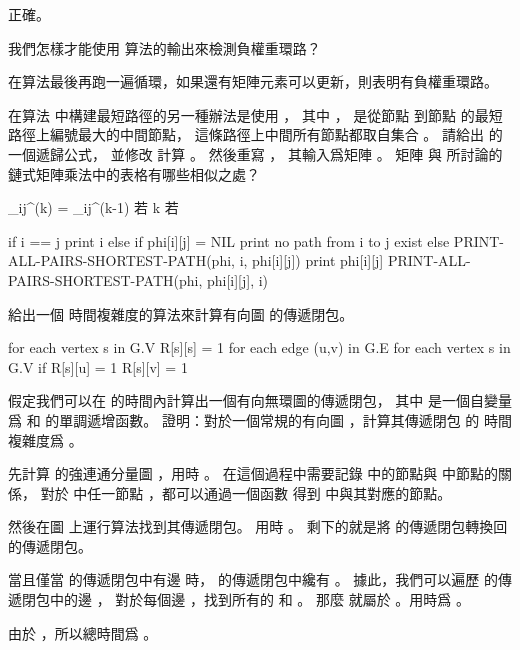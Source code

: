 \startANSWER
正確。
\stopANSWER

\startEXERCISE
我們怎樣才能使用  算法的輸出來檢測負權重環路？
\stopEXERCISE

\startANSWER
在算法最後再跑一遍循環，如果還有矩陣元素可以更新，則表明有負權重環路。
\stopANSWER

\startEXERCISE
在算法  中構建最短路徑的另一種辦法是使用 ，
其中 ，
  是從節點  到節點  的最短路徑上編號最大的中間節點，
這條路徑上中間所有節點都取自集合 。
請給出  的一個遞歸公式，
並修改  計算 。
然後重寫 ，
其輸入爲矩陣 。
矩陣 \m{\Phi} 與 所討論的鏈式矩陣乘法中的表格有哪些相似之處？
\stopEXERCISE

\startANSWER
\startformula
\phi_{ij}^{(k)} = \startcases
\NC \phi_{ij}^{(k-1)} \NC 若  \NR
\NC k \NC 若  \NR
\stopcases
\stopformula

\startCLRS
if i == j
	print i
else if phi[i][j] = NIL
	print no path from i to j exist
else
	PRINT-ALL-PAIRS-SHORTEST-PATH(phi, i, phi[i][j])
	print phi[i][j]
	PRINT-ALL-PAIRS-SHORTEST-PATH(phi, phi[i][j], i)
\stopCLRS
\stopANSWER

\startEXERCISE
給出一個  時間複雜度的算法來計算有向圖  的傳遞閉包。
\stopEXERCISE

\startANSWER
\startCLRS
for each vertex s in G.V
	R[s][s] = 1
for each edge (u,v) in G.E
	for each vertex s in G.V
		if R[s][u] = 1
			R[s][v] = 1
\stopCLRS
\stopANSWER

\startEXERCISE
假定我們可以在  的時間內計算出一個有向無環圖的傳遞閉包，
其中  是一個自變量爲  和  的單調遞增函數。
證明：對於一個常規的有向圖 ，計算其傳遞閉包  的
時間複雜度爲 。
\stopEXERCISE

\startANSWER
先計算  的強連通分量圖 ，用時 。
在這個過程中需要記錄  中的節點與  中節點的關係，
對於  中任一節點 ，都可以通過一個函數  得到  中與其對應的節點。

然後在圖  上運行算法找到其傳遞閉包。
用時 。
剩下的就是將  的傳遞閉包轉換回  的傳遞閉包。

當且僅當  的傳遞閉包中有邊  時，
  的傳遞閉包中纔有 。
據此，我們可以遍歷  的傳遞閉包中的邊 ，
對於每個邊 ，找到所有的  和 。
那麼  就屬於 。用時爲 。

由於 ，所以總時間爲 。
\stopANSWER

\stopsection

